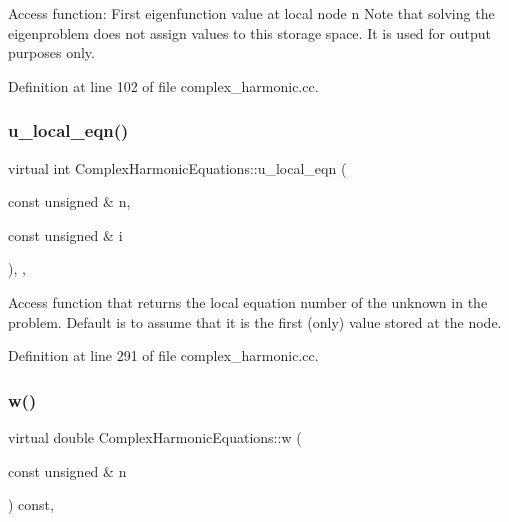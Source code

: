 Access function\+: First eigenfunction value at local node n Note that solving the eigenproblem does not assign values to this storage space. It is used for output purposes only. 



Definition at line 102 of file complex\+\_\+harmonic.\+cc.

\mbox{\label{classComplexHarmonicEquations_a3538cae061c24db2db1fc277c0a09da4}} 
\subsubsection{\texorpdfstring{u\+\_\+local\+\_\+eqn()}{u\_local\_eqn()}}
{\footnotesize\ttfamily virtual int Complex\+Harmonic\+Equations\+::u\+\_\+local\+\_\+eqn (\begin{DoxyParamCaption}\item[{const unsigned \&}]{n,  }\item[{const unsigned \&}]{i }\end{DoxyParamCaption})\hspace{0.3cm}{\ttfamily [inline]}, {\ttfamily [protected]}, {\ttfamily [virtual]}}



Access function that returns the local equation number of the unknown in the problem. Default is to assume that it is the first (only) value stored at the node. 



Definition at line 291 of file complex\+\_\+harmonic.\+cc.

\mbox{\label{classComplexHarmonicEquations_a9b3955ee987827d831e44eeb43dcae63}} 
\subsubsection{\texorpdfstring{w()}{w()}}
{\footnotesize\ttfamily virtual double Complex\+Harmonic\+Equations\+::w (\begin{DoxyParamCaption}\item[{const unsigned \&}]{n }\end{DoxyParamCaption}) const\hspace{0.3cm}{\ttfamily [inline]}, {\ttfamily [virtual]}}



